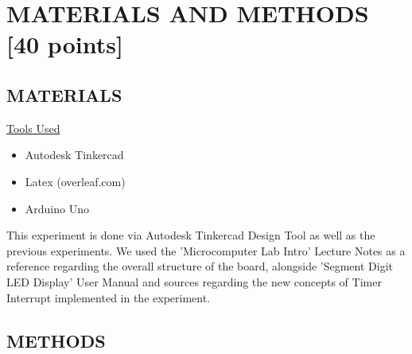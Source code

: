 \documentclass[pdftex,12pt,a4paper]{article}
\begin{document}
\section{MATERIALS AND METHODS [40 points]}
\subsection{MATERIALS}
\underline{Tools Used}\cite{booklet}
\begin{itemize}
    \item {Autodesk Tinkercad}
    \item{Latex (overleaf.com)}
    \item{Arduino Uno}
    
\end{itemize}

This experiment is done via Autodesk Tinkercad Design Tool as well as the previous experiments. We used the 'Microcomputer Lab Intro' Lecture Notes as a reference regarding the overall structure of the board, alongside 'Segment Digit LED Display' User Manual and sources regarding the new concepts of Timer Interrupt implemented in the experiment. 
\newpage
\subsection{METHODS}
\end{document}
